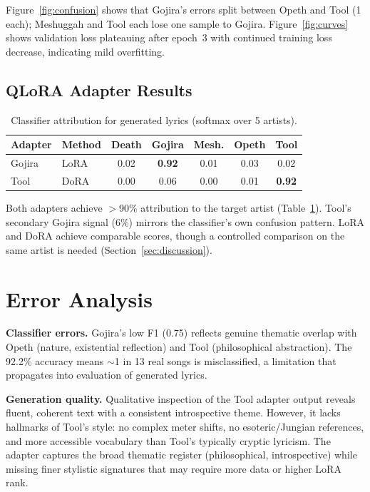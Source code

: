 \documentclass[runningheads]{llncs}
\begin{document}
Figure~\ref{fig:confusion} shows that Gojira's errors split between Opeth and Tool (1 each); Meshuggah and Tool each lose one sample to Gojira. Figure~\ref{fig:curves} shows validation loss plateauing after epoch~3 with continued training loss decrease, indicating mild overfitting.

\subsection{QLoRA Adapter Results}

\begin{table}[t]
\centering
\caption{Classifier attribution for generated lyrics (softmax over 5 artists).}
\label{tab:qlora}
\begin{tabular}{llccccc}
\toprule
\textbf{Adapter} & \textbf{Method} & \textbf{Death} & \textbf{Gojira} & \textbf{Mesh.} & \textbf{Opeth} & \textbf{Tool} \\
\midrule
Gojira & LoRA & 0.02 & \textbf{0.92} & 0.01 & 0.03 & 0.02 \\
Tool   & DoRA & 0.00 & 0.06 & 0.00 & 0.01 & \textbf{0.92} \\
\bottomrule
\end{tabular}
\end{table}

Both adapters achieve $>$90\% attribution to the target artist (Table~\ref{tab:qlora}). Tool's secondary Gojira signal (6\%) mirrors the classifier's own confusion pattern. LoRA and DoRA achieve comparable scores, though a controlled comparison on the same artist is needed (Section~\ref{sec:discussion}).

\section{Error Analysis}
\label{sec:error}

\textbf{Classifier errors.}
Gojira's low F1 (0.75) reflects genuine thematic overlap with Opeth (nature, existential reflection) and Tool (philosophical abstraction). The 92.2\% accuracy means ${\sim}$1 in 13 real songs is misclassified, a limitation that propagates into evaluation of generated lyrics.

\textbf{Generation quality.}
Qualitative inspection of the Tool adapter output reveals fluent, coherent text with a consistent introspective theme. However, it lacks hallmarks of Tool's style: no complex meter shifts, no esoteric/Jungian references, and more accessible vocabulary than Tool's typically cryptic lyricism. The adapter captures the broad thematic register (philosophical, introspective) while missing finer stylistic signatures that may require more data or higher LoRA rank.
\end{document}
